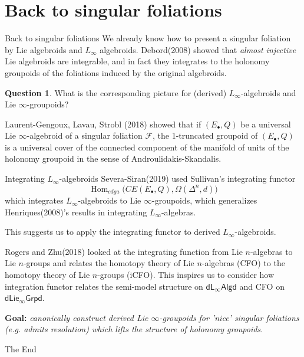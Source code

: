 \documentclass{beamer}
\theoremstyle{definition}
\newtheorem{ques}[thm]{Question}
\theoremstyle{remark}
\numberwithin{equation}{section}
\newcommand{\CF}{{\mathcal F}}
\newcommand{\lgpi}{\mathsf{dLie_{\infty}Grpd}}
\newcommand{\lali}{\mathsf{dL_{\infty}Algd}}
\newcommand{\Hom}{\operatorname{Hom}}
\begin{document}
\section{Back to singular foliations}

\begin{frame}{Back to singular foliations}
We already know how to present a singular foliation by Lie algebroids and $L_{\infty}$ algebroids. Debord(2008) showed that {\it almost injective} Lie algebroids are integrable, and in fact they integrates to the holonomy groupoids of the foliations induced by the original algebroids.

\begin{ques}
	What is the corresponding picture for (derived) $L_{\infty}$-algebroids and Lie $\infty$-groupoids?
\end{ques}

Laurent-Gengoux, Lavau, Strobl (2018) showed that
	if $(E_{\bullet},Q)$ be a universal Lie $\infty$-algebroid of a singular foliation $\CF$, the 1-truncated groupoid of $(E_{\bullet},Q)$ is a universal cover of the connected component of the manifold of units of the holonomy groupoid in the sense of Androulidakis-Skandalis.




\end{frame}


\begin{frame}{Integrating $L_{\infty}$-algebroids}
Severa-Siran(2019) used Sullivan's integrating functor $$\Hom_{cdga}\big(CE(E_{\bullet},Q), \Omega(\Delta^n,d)\big)$$
which integrates $L_{\infty}$-algebroids to Lie $\infty$-groupoids, which generalizes Henriques(2008)'s results in integrating $L_{\infty}$-algebras.

This suggests us to apply the integrating functor to derived $L_{\infty}$-algebroids. 

Rogers and Zhu(2018) looked at the integrating function from Lie $n$-algebras to Lie $n$-groups and relates the homotopy theory of Lie $n$-algebras (CFO) to the homotopy theory of Lie $n$-groups (iCFO). This inspires us to consider how integration functor relates the semi-model structure on $\lali$ and CFO on $\lgpi$.

{\bf Goal:} {\it canonically construct derived Lie $\infty$-groupoids for 'nice' singular foliations (e.g. admits resolution) which lifts the structure of holonomy groupoids.}
\end{frame}






\begin{frame}
\Huge{\centerline{The End}}
\end{frame}

\end{document}
